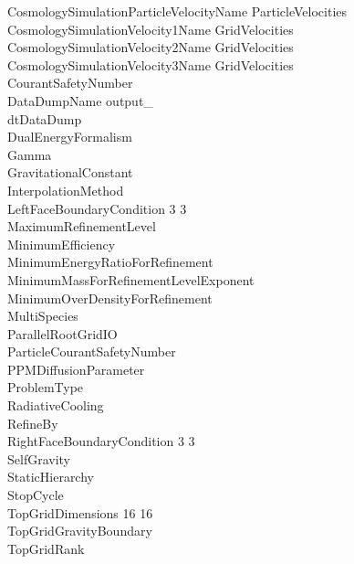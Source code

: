 \documentclass{book}
\begin{document}
{\begin{tabbing}
\> CosmologySimulationParticleVelocityName \> ParticleVelocities \\
\> CosmologySimulationVelocity1Name        \> GridVelocities \\
\> CosmologySimulationVelocity2Name        \> GridVelocities \\
\> CosmologySimulationVelocity3Name        \> GridVelocities \\
\> CourantSafetyNumber     \\
\> DataDumpName           \> output\_ \\
\> dtDataDump                       \\
\> DualEnergyFormalism            \\
\> Gamma                   \\
\> GravitationalConstant              \\
\> InterpolationMethod          \\
\> LeftFaceBoundaryCondition   3 3    \\
\> MaximumRefinementLevel         \\
\> MinimumEfficiency            \\
\> MinimumEnergyRatioForRefinement   \\
\> MinimumMassForRefinementLevelExponent  \\
\> MinimumOverDensityForRefinement   \\
\> MultiSpecies                 \\
\> ParallelRootGridIO      \\
\> ParticleCourantSafetyNumber  \\
\> PPMDiffusionParameter          \\
\> ProblemType                       \\
\> RadiativeCooling             \\
\> RefineBy                       \\
\> RightFaceBoundaryCondition  3 3 \\
\> SelfGravity                        \\
\> StaticHierarchy                \\
\> StopCycle                         \\
\> TopGridDimensions           16 16 \\
\> TopGridGravityBoundary             \\
\> TopGridRank                
\end{tabbing}}
\end{document}
